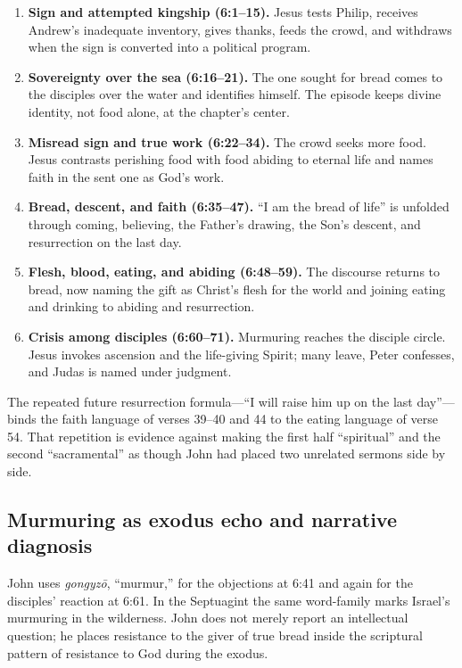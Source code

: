 \begin{deepstudy}
\begin{enumerate}
\item \textbf{Sign and attempted kingship (6:1--15).} Jesus tests Philip,
receives Andrew's inadequate inventory, gives thanks, feeds the crowd, and
withdraws when the sign is converted into a political program.
\item \textbf{Sovereignty over the sea (6:16--21).} The one sought for bread
comes to the disciples over the water and identifies himself. The episode keeps
divine identity, not food alone, at the chapter's center.
\item \textbf{Misread sign and true work (6:22--34).} The crowd seeks more
food. Jesus contrasts perishing food with food abiding to eternal life and
names faith in the sent one as God's work.
\item \textbf{Bread, descent, and faith (6:35--47).} ``I am the bread of life''
is unfolded through coming, believing, the Father's drawing, the Son's descent,
and resurrection on the last day.
\item \textbf{Flesh, blood, eating, and abiding (6:48--59).} The discourse
returns to bread, now naming the gift as Christ's flesh for the world and
joining eating and drinking to abiding and resurrection.
\item \textbf{Crisis among disciples (6:60--71).} Murmuring reaches the
disciple circle. Jesus invokes ascension and the life-giving Spirit; many leave,
Peter confesses, and Judas is named under judgment.
\end{enumerate}

The repeated future resurrection formula---``I will raise him up on the last
day''---binds the faith language of verses 39--40 and 44 to the eating language
of verse 54. That repetition is evidence against making the first half
``spiritual'' and the second ``sacramental'' as though John had placed two
unrelated sermons side by side.

\subsection{Murmuring as exodus echo and narrative diagnosis}

John uses \emph{gongyz\=o}, ``murmur,'' for the objections at 6:41 and again
for the disciples' reaction at 6:61. In the Septuagint the same word-family
marks Israel's murmuring in the wilderness. John does not merely report an
intellectual question; he places resistance to the giver of true bread inside
the scriptural pattern of resistance to God during the exodus.


\end{deepstudy}
